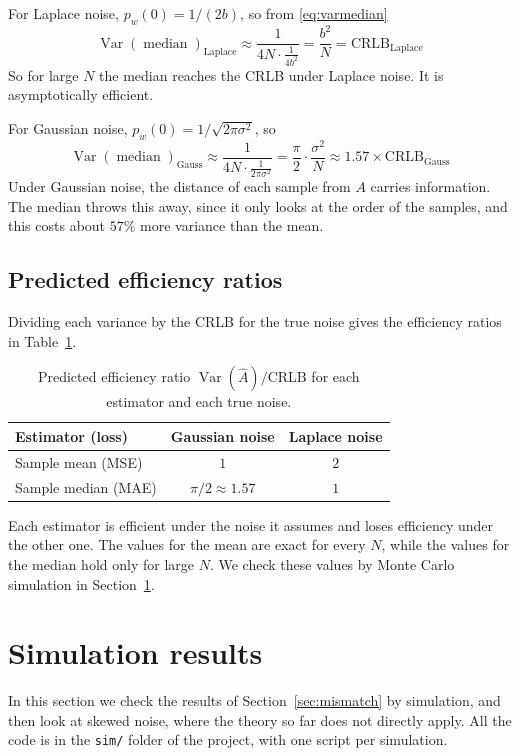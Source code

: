 \documentclass[11pt]{article}
\numberwithin{figure}{section}
\numberwithin{equation}{section}
\begin{document}
For Laplace noise, $p_w(0) = 1/(2b)$, so from \eqref{eq:varmedian}
\[
  \boxed{\operatorname{Var}(\operatorname{median})_{\text{Laplace}} \approx
  \frac{1}{4N \cdot \frac{1}{4b^2}} = \frac{b^2}{N} = \text{CRLB}_{\text{Laplace}}}
\]
So for large $N$ the median reaches the CRLB under Laplace noise. It is asymptotically efficient.

For Gaussian noise, $p_w(0) = 1/\sqrt{2\pi\sigma^2}$, so
\[
  \boxed{\operatorname{Var}(\operatorname{median})_{\text{Gauss}} \approx
  \frac{1}{4N \cdot \frac{1}{2\pi\sigma^2}} = \frac{\pi}{2}\cdot\frac{\sigma^2}{N}
  \approx 1.57 \times \text{CRLB}_{\text{Gauss}}}
\]
Under Gaussian noise, the distance of each sample from $A$ carries information. The median
throws this away, since it only looks at the order of the samples, and this costs about $57\%$
more variance than the mean.

\subsection{Predicted efficiency ratios}

Dividing each variance by the CRLB for the true noise gives the efficiency ratios in
Table~\ref{tab:predicted}.

\begin{table}[H]
\centering
\begin{tabular}{lcc}
\toprule
Estimator (loss) & Gaussian noise & Laplace noise \\
\midrule
Sample mean (MSE)   & $1$ & $2$ \\
Sample median (MAE) & $\pi/2 \approx 1.57$ & $1$ \\
\bottomrule
\end{tabular}
\caption{Predicted efficiency ratio $\operatorname{Var}(\hat A)/\text{CRLB}$ for each estimator
and each true noise.}
\label{tab:predicted}
\end{table}

Each estimator is efficient under the noise it assumes and loses efficiency under the other one.
The values for the mean are exact for every $N$, while the values for the median hold only for
large $N$. We check these values by Monte Carlo simulation in Section~\ref{sec:sims}.

\section{Simulation results}
\label{sec:sims}

In this section we check the results of Section~\ref{sec:mismatch} by simulation, and then look
at skewed noise, where the theory so far does not directly apply. All the code is in the
\texttt{sim/} folder of the project, with one script per simulation.
\end{document}
